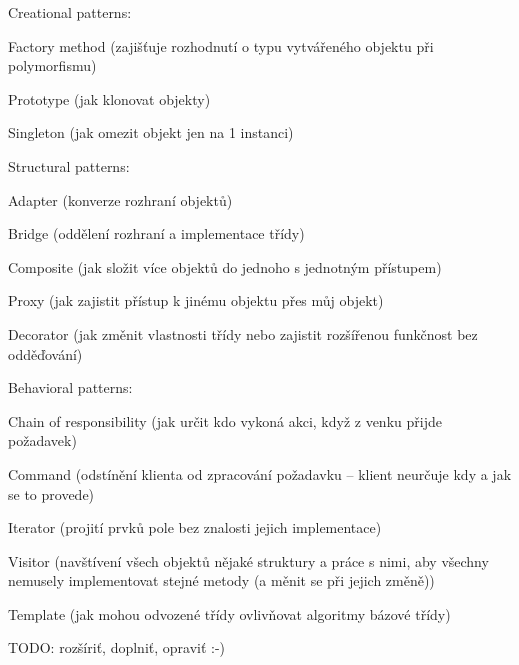 \begin{priklady}
Creational patterns:
\begin{pitemize}
    \item Factory method (zajišťuje rozhodnutí o typu vytvářeného objektu při polymorfismu)
    \item Prototype (jak klonovat objekty)
    \item Singleton (jak omezit objekt jen na 1 instanci)
\end{pitemize}

Structural patterns:
\begin{pitemize}
    \item Adapter (konverze rozhraní objektů)
    \item Bridge (oddělení rozhraní a implementace třídy)
    \item Composite (jak složit více objektů do jednoho s jednotným přístupem)
    \item Proxy (jak zajistit přístup k jinému objektu přes můj objekt)
    \item Decorator (jak změnit vlastnosti třídy nebo zajistit rozšířenou funkčnost bez odděďování)
\end{pitemize}

Behavioral patterns:
\begin{pitemize}
    \item Chain of responsibility (jak určit kdo vykoná akci, když z venku přijde požadavek)
    \item Command (odstínění klienta od zpracování požadavku -- klient neurčuje kdy a jak se to provede)
    \item Iterator (projití prvků pole bez znalosti jejich implementace)
    \item Visitor (navštívení všech objektů nějaké struktury a práce s nimi, aby všechny nemusely implementovat stejné metody (a měnit se při jejich změně))
    \item Template (jak mohou odvozené třídy ovlivňovat algoritmy bázové třídy)
\end{pitemize}
\end{priklady}


TODO: rozšíriť, doplniť, opraviť :-)
